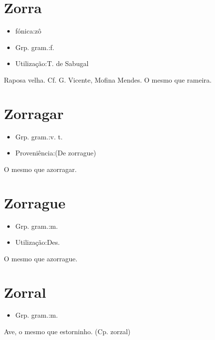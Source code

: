 \section{Zorra}
\begin{itemize}
\item {fónica:zô}
\end{itemize}
\begin{itemize}
\item {Grp. gram.:f.}
\end{itemize}
\begin{itemize}
\item {Utilização:T. de Sabugal}
\end{itemize}
Raposa velha. Cf. G. Vicente, \textunderscore Mofina Mendes\textunderscore .
O mesmo que \textunderscore rameira\textunderscore .
\section{Zorragar}
\begin{itemize}
\item {Grp. gram.:v. t.}
\end{itemize}
\begin{itemize}
\item {Proveniência:(De \textunderscore zorrague\textunderscore )}
\end{itemize}
O mesmo que \textunderscore azorragar\textunderscore .
\section{Zorrague}
\begin{itemize}
\item {Grp. gram.:m.}
\end{itemize}
\begin{itemize}
\item {Utilização:Des.}
\end{itemize}
O mesmo que \textunderscore azorrague\textunderscore .
\section{Zorral}
\begin{itemize}
\item {Grp. gram.:m.}
\end{itemize}
Ave, o mesmo que \textunderscore estorninho\textunderscore .
(Cp. \textunderscore zorzal\textunderscore )
